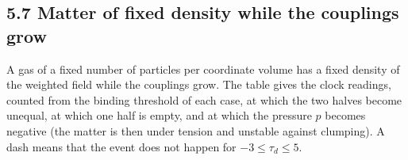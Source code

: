 \documentclass[
  10pt,
]{article}
\begin{document}
\hypertarget{matter-of-fixed-density-while-the-couplings-grow}{%
\subsection{5.7 Matter of fixed density while the couplings
grow}\label{matter-of-fixed-density-while-the-couplings-grow}}

A gas of a fixed number of particles per coordinate volume has a fixed
density of the weighted field while the couplings grow. The table gives
the clock readings, counted from the binding threshold of each case, at
which the two halves become unequal, at which one half is empty, and at
which the pressure \(p\) becomes negative (the matter is then under
tension and unstable against clumping). A dash means that the event does
not happen for \(-3\le\tau_d\le5\).
\end{document}
